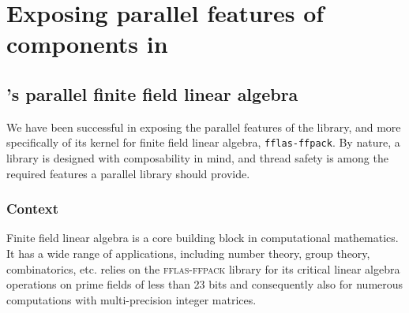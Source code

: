 \documentclass{deliverablereport}
\author{Alexis Breust, Karim Belabas, Jean-Guillaume Dumas, Jeroen
  Demeyer, William B. Hart, Steve Linton, Clément Pernet, Reimer
  Behrends, Nicolas M. Thiéry, Hongguang Zhu}
\newcommand{\fflasffpack}{\textsc{fflas-ffpack}\xspace}
\begin{document}
\maketitle
\githubissuedescription


\tableofcontents



\section{Exposing parallel features of components in \SageMath}

\subsection{\Linbox's parallel finite field linear algebra}

We have been successful in exposing the parallel features of the \Linbox
library, and more specifically of its kernel for finite field linear algebra,
\texttt{fflas-ffpack}. By nature, a library is designed with composability in
mind, and thread safety is among the required features a parallel library should
provide.

\subsubsection{Context}

Finite field linear algebra is a core building block in computational mathematics.
It has a wide range of applications, including number theory, group theory, combinatorics, etc. \SageMath relies on the
\fflasffpack library for its critical linear algebra operations on prime fields of less than 23 bits and consequently
also for numerous computations with multi-precision integer matrices.  
\end{document}

